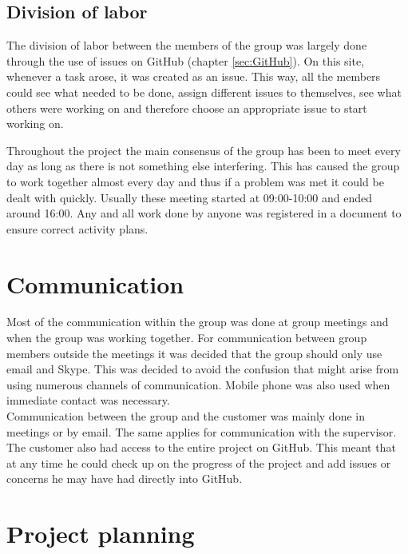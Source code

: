 \subsection{Division of labor}
The division of labor between the members of the group was largely done through the use of issues on GitHub (chapter \ref{sec:GitHub}). On this site, whenever a task arose, it was created as an issue. This way, all the members could see what needed to be done, assign different issues to themselves, see what others were working on and therefore choose an appropriate issue to start working on.

Throughout the project the main consensus of the group has been to meet every day as long as there is not something else interfering. This has caused the group to work together almost every day and thus if a problem was met it could be dealt with quickly. Usually these meeting started at 09:00-10:00 and ended around 16:00. Any and all work done by anyone was registered in a document to ensure correct activity plans.

\section{Communication}
Most of the communication within the group was done at group meetings and when the group was working together. For communication between group members outside the meetings it was decided that the group should only use email and Skype. This was decided to avoid the confusion that might arise from using numerous channels of communication. Mobile phone was also used when immediate contact was necessary.\\
\newline
Communication between the group and the customer was mainly done in meetings or by email. The same applies for communication with the supervisor. The customer also had access to the entire project on GitHub. This meant that at any time he could check up on the progress of the project and add issues or concerns he may have had directly into GitHub.

\section{Project planning}

\label{projectplanning}

